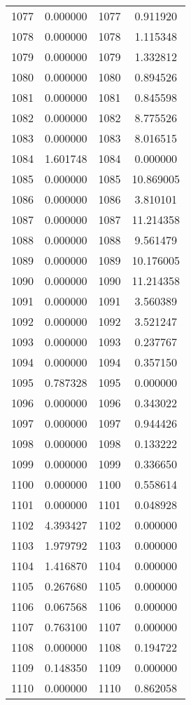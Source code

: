 \documentclass[12pt]{article}
\begin{document}
\begin{longtable}{@{}cccc@{}}
1077 & 0.000000 & 1077 & 0.911920 \\
1078 & 0.000000 & 1078 & 1.115348 \\
1079 & 0.000000 & 1079 & 1.332812 \\
1080 & 0.000000 & 1080 & 0.894526 \\
1081 & 0.000000 & 1081 & 0.845598 \\
1082 & 0.000000 & 1082 & 8.775526 \\
1083 & 0.000000 & 1083 & 8.016515 \\
1084 & 1.601748 & 1084 & 0.000000 \\
1085 & 0.000000 & 1085 & 10.869005 \\
1086 & 0.000000 & 1086 & 3.810101 \\
1087 & 0.000000 & 1087 & 11.214358 \\
1088 & 0.000000 & 1088 & 9.561479 \\
1089 & 0.000000 & 1089 & 10.176005 \\
1090 & 0.000000 & 1090 & 11.214358 \\
1091 & 0.000000 & 1091 & 3.560389 \\
1092 & 0.000000 & 1092 & 3.521247 \\
1093 & 0.000000 & 1093 & 0.237767 \\
1094 & 0.000000 & 1094 & 0.357150 \\
1095 & 0.787328 & 1095 & 0.000000 \\
1096 & 0.000000 & 1096 & 0.343022 \\
1097 & 0.000000 & 1097 & 0.944426 \\
1098 & 0.000000 & 1098 & 0.133222 \\
1099 & 0.000000 & 1099 & 0.336650 \\
1100 & 0.000000 & 1100 & 0.558614 \\
1101 & 0.000000 & 1101 & 0.048928 \\
1102 & 4.393427 & 1102 & 0.000000 \\
1103 & 1.979792 & 1103 & 0.000000 \\
1104 & 1.416870 & 1104 & 0.000000 \\
1105 & 0.267680 & 1105 & 0.000000 \\
1106 & 0.067568 & 1106 & 0.000000 \\
1107 & 0.763100 & 1107 & 0.000000 \\
1108 & 0.000000 & 1108 & 0.194722 \\
1109 & 0.148350 & 1109 & 0.000000 \\
1110 & 0.000000 & 1110 & 0.862058 \\

\end{longtable}
\end{document}
